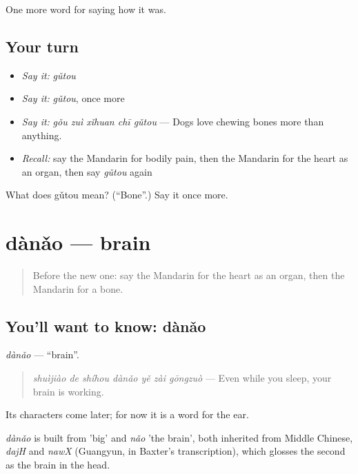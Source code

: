 \begin{grammarlens}[title={What you've built}]
One more word for saying how it was.
\end{grammarlens}

\subsection*{Your turn}
\begin{itemize}
\raggedright
  \item \emph{Say it:} \emph{gǔtou}
  \item \emph{Say it:} \emph{gǔtou}, once more
  \item \emph{Say it:} \emph{gǒu zuì xǐhuan chī gǔtou} — Dogs love chewing bones more than anything.
  \item \emph{Recall:} say the Mandarin for bodily pain, then the Mandarin for the heart as an organ, then say \emph{gǔtou} again
\end{itemize}

\begin{tcolorbox}[breakable,colback=teal!4,colframe=teal!35!black,title={Before you move on}]
What does gǔtou mean? (\textquotedblleft{}Bone\textquotedblright{}.) Say it once more.
\end{tcolorbox}
\section[dànǎo]{dànǎo — brain}

\label{lesson:ZH-C477-danao}



\begin{quote}
Before the new one: say the Mandarin for the heart as an organ, then the Mandarin for a bone.
\end{quote}

\subsection*{You'll want to know: dànǎo}
\emph{dànǎo} — \textquotedblleft{}brain\textquotedblright{}.

\begin{quote}
\emph{shuìjiào de shíhou dànǎo yě zài gōngzuò} — Even while you sleep, your brain is working.
\end{quote}

Its characters come later; for now it is a word for the ear.

\begin{cousinweb}
\emph{dànǎo} is built from  'big' and \emph{nǎo} 'the brain', both inherited from Middle Chinese, \emph{dajH} and \emph{nawX} (Guangyun, in Baxter's transcription), which glosses the second as the brain in the head.
\end{cousinweb}

